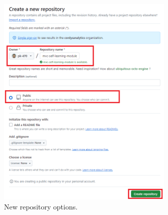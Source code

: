 \documentclass[a4paper,10pt]{article}
\begin{document}
\begin{figure}[htbp]
    \centering
    \includegraphics[width=0.75\textwidth]{new_repository_options.png}
    \caption{New repository options.}
    \label{new_repository_options}   
\end{figure}
\end{document}
